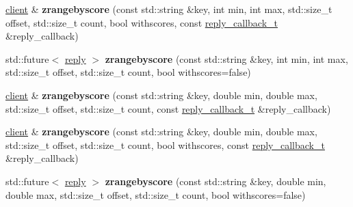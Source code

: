 \begin{DoxyCompactItemize}
\item 
\mbox{\label{classcpp__redis_1_1client_a6dabde5a64f366e52b6ab108aef56975}} 
\mbox{\hyperlink{classcpp__redis_1_1client}{client}} \& {\bfseries zrangebyscore} (const std\+::string \&key, int min, int max, std\+::size\+\_\+t offset, std\+::size\+\_\+t count, bool withscores, const \mbox{\hyperlink{classcpp__redis_1_1client_af7a65eb21aa25230bfbb0b0203c4fc04}{reply\+\_\+callback\+\_\+t}} \&reply\+\_\+callback)
\item 
\mbox{\label{classcpp__redis_1_1client_a6ebc52eccfc444fe11ad40063158e262}} 
std\+::future$<$ \mbox{\hyperlink{classcpp__redis_1_1reply}{reply}} $>$ {\bfseries zrangebyscore} (const std\+::string \&key, int min, int max, std\+::size\+\_\+t offset, std\+::size\+\_\+t count, bool withscores=false)
\item 
\mbox{\label{classcpp__redis_1_1client_a060e1c63341da72f678363fc7c9efa6b}} 
\mbox{\hyperlink{classcpp__redis_1_1client}{client}} \& {\bfseries zrangebyscore} (const std\+::string \&key, double min, double max, std\+::size\+\_\+t offset, std\+::size\+\_\+t count, const \mbox{\hyperlink{classcpp__redis_1_1client_af7a65eb21aa25230bfbb0b0203c4fc04}{reply\+\_\+callback\+\_\+t}} \&reply\+\_\+callback)
\item 
\mbox{\label{classcpp__redis_1_1client_a4f5e81543f8138f897c10fbe17e56804}} 
\mbox{\hyperlink{classcpp__redis_1_1client}{client}} \& {\bfseries zrangebyscore} (const std\+::string \&key, double min, double max, std\+::size\+\_\+t offset, std\+::size\+\_\+t count, bool withscores, const \mbox{\hyperlink{classcpp__redis_1_1client_af7a65eb21aa25230bfbb0b0203c4fc04}{reply\+\_\+callback\+\_\+t}} \&reply\+\_\+callback)
\item 
\mbox{\label{classcpp__redis_1_1client_af9d54a3c81954e838e31d1c2dd84bf39}} 
std\+::future$<$ \mbox{\hyperlink{classcpp__redis_1_1reply}{reply}} $>$ {\bfseries zrangebyscore} (const std\+::string \&key, double min, double max, std\+::size\+\_\+t offset, std\+::size\+\_\+t count, bool withscores=false)
\item 
\mbox{\label{classcpp__redis_1_1client_adfcaa1035607cde9679783d0b9f4c72b}} 

\end{DoxyCompactItemize}
